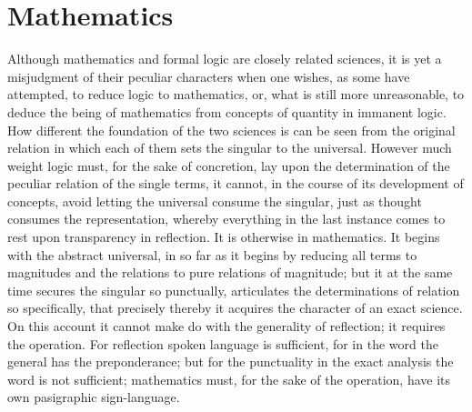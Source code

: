 \documentclass[12pt]{book}
\begin{document}
\section{Mathematics}
\label{sec:12}

\noindent Although mathematics and formal logic are closely related sciences, it
is yet a misjudgment of their peculiar characters when one wishes, as some have
attempted, to reduce logic to mathematics, or, what is still more unreasonable, to
deduce the being of mathematics from concepts of quantity in immanent logic. How
different the foundation of the two sciences is can be seen from the original
relation in which each of them sets the singular to the universal. However much
weight logic must, for the sake of concretion, lay upon the determination of the
peculiar relation of the single terms, it cannot, in the course of its development
of concepts, avoid letting the universal consume the singular, just as thought
consumes the representation, whereby everything in the last instance comes to rest
upon transparency in reflection. It is otherwise in mathematics. It begins with the
abstract universal, in so far as it begins by reducing all terms to magnitudes and
the relations to pure relations of magnitude; but it at the same time secures the
singular so punctually, articulates the determinations of relation so specifically,
that precisely thereby it acquires the character of an exact science. On this
account it cannot make do with the generality of reflection; it requires the
operation. For reflection spoken language is sufficient, for in the word the
general has the preponderance; but for the punctuality in the exact analysis the
word is not sufficient; mathematics must, for the sake of the operation, have its
own pasigraphic sign-language.
\end{document}
